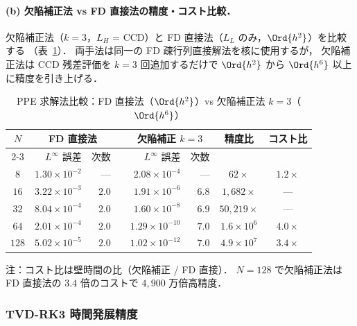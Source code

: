 \paragraph{(b) 欠陥補正法 vs FD 直接法の精度・コスト比較．}

欠陥補正法（$k=3$，$L_H$ = CCD）と FD 直接法（$L_L$ のみ，$\Ord{h^2}$）を比較する
（表~\ref{tab:dc_vs_fd}）．
両手法は同一の FD 疎行列直接解法を核に使用するが，
欠陥補正法は CCD 残差評価を $k=3$ 回追加するだけで
$\Ord{h^2}$ から $\Ord{h^6}$ 以上に精度を引き上げる．

\begin{table}[htbp]
\centering
\small
\caption{PPE 求解法比較：FD 直接法（$\Ord{h^2}$）vs 欠陥補正法 $k=3$（$\Ord{h^6}$）}
\label{tab:dc_vs_fd}
\renewcommand{\arraystretch}{1.3}
\begin{tabular}{crrcrrcc}
\toprule
$N$ & \multicolumn{2}{c}{FD 直接法} & & \multicolumn{2}{c}{欠陥補正 $k=3$} & 精度比 & コスト比 \\
\cmidrule{2-3} \cmidrule{5-6}
 & $L^\infty$ 誤差 & 次数 & & $L^\infty$ 誤差 & 次数 & & \\
\midrule
$8$   & $1.30 \times 10^{-2}$ & ---  & & $2.08 \times 10^{-4}$ & ---  & $62\times$ & $1.2\times$ \\
$16$  & $3.22 \times 10^{-3}$ & $2.0$ & & $1.91 \times 10^{-6}$ & $6.8$ & $1{,}682\times$ & --- \\
$32$  & $8.04 \times 10^{-4}$ & $2.0$ & & $1.60 \times 10^{-8}$ & $6.9$ & $50{,}219\times$ & --- \\
$64$  & $2.01 \times 10^{-4}$ & $2.0$ & & $1.29 \times 10^{-10}$ & $7.0$ & $1.6 \times 10^{6}$ & $4.0\times$ \\
$128$ & $5.02 \times 10^{-5}$ & $2.0$ & & $1.02 \times 10^{-12}$ & $7.0$ & $4.9 \times 10^{7}$ & $3.4\times$ \\
\bottomrule
\end{tabular}

\smallskip
\noindent 注：コスト比は壁時間の比（欠陥補正 / FD 直接）．
$N=128$ で欠陥補正法は FD 直接法の $3.4$ 倍のコストで $4{,}900$ 万倍高精度．
\end{table}

\subsubsection{TVD-RK3 時間発展精度}
\label{sec:verify_tvd_rk3}

